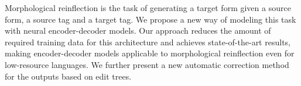 Morphological reinflection is the task of generating a target form given a source form, a source tag and a target tag.  We propose a new way of modeling this task with neural encoder-decoder models.  Our approach reduces the amount of required training data for this architecture and achieves state-of-the-art results, making encoder-decoder models applicable to morphological reinflection even for low-resource languages. We further present a new automatic correction method for the outputs based on edit trees.
